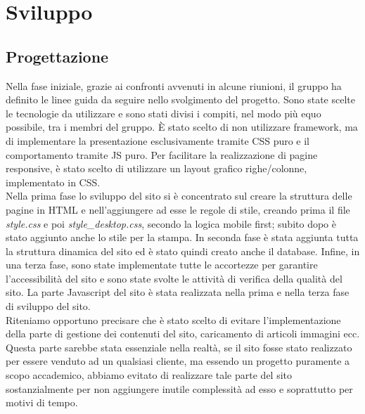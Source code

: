\section{Sviluppo}

\subsection{Progettazione}
Nella fase iniziale, grazie ai confronti avvenuti in alcune riunioni, il gruppo ha definito le linee guida da seguire nello svolgimento del progetto. Sono state scelte le tecnologie da utilizzare e sono stati divisi i compiti, nel modo più equo possibile, tra i membri del gruppo. È stato scelto di non utilizzare framework, ma di implementare la presentazione esclusivamente tramite CSS puro e il comportamento tramite JS puro. Per facilitare la realizzazione di pagine responsive, è stato scelto di utilizzare un layout grafico righe/colonne, implementato in CSS. 
\\Nella prima fase lo sviluppo del sito si è concentrato sul creare la struttura delle pagine in HTML e nell'aggiungere ad esse le regole di stile, creando prima il file \textit{style.css} e poi \textit{style\_desktop.css}, secondo la logica mobile first; subito dopo è stato aggiunto anche lo stile per la stampa. In seconda fase è stata aggiunta tutta la struttura dinamica del sito ed è stato quindi creato anche il database. Infine, in una terza fase, sono state implementate tutte le accortezze per garantire l'accessibilità del sito e sono state svolte le attività di verifica della qualità del sito. La parte Javascript del sito è stata realizzata nella prima e nella terza fase di sviluppo del sito. 
\\Riteniamo opportuno precisare che è stato scelto di evitare l'implementazione della parte di gestione dei contenuti del sito, caricamento di articoli immagini ecc. Questa parte sarebbe stata essenziale nella realtà, se il sito fosse stato realizzato per essere venduto ad un qualsiasi cliente, ma essendo un progetto puramente a scopo accademico, abbiamo evitato di realizzare tale parte del sito sostanzialmente per non aggiungere inutile complessità ad esso e soprattutto per motivi di tempo.


